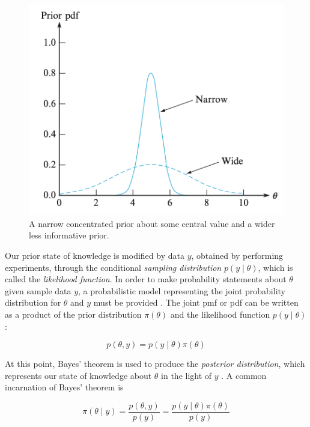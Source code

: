 \begin{figure}[H]
    \centering
    \includegraphics[scale=0.6]{./3_Images/prior_illustration.png}
    \caption{A narrow concentrated prior about some central value and a wider less informative prior.}
    \label{fig:prior_illustration}
\end{figure}


Our prior state of knowledge is modified by data $y$, obtained by performing experiments, through the conditional \textit{sampling distribution} $p (y \mid \theta)$, which is called the \textit{likelihood function}. In order to make probability statements about $\theta$ given sample data $y$, a probabilistic model representing the joint probability distribution for $\theta$ and $y$ must be provided \cite[p. 6]{BDA}. The joint pmf or pdf can be written as a product of the prior distribution $\pi(\theta)$ and the likelihood function $p(y \mid \theta)$:

\begin{equation*}
    p(\theta, y) = p(y \mid \theta) \pi(\theta) 
\end{equation*}

At this point, Bayes' theorem is used to produce the \textit{posterior distribution}, which represents our state of knowledge about $\theta$ in the light of $y$ \cite[p. 6]{Sivia}. A common incarnation of Bayes' theorem is

\begin{equation}\label{eq:bayes_theorem}
    \pi \left( \theta \mid y\right) = \frac{p(\theta, y)}{p(y)}  = \frac{p \left(y \mid \theta \right) \pi \left(\theta \right)}{p(y)}
\end{equation}

